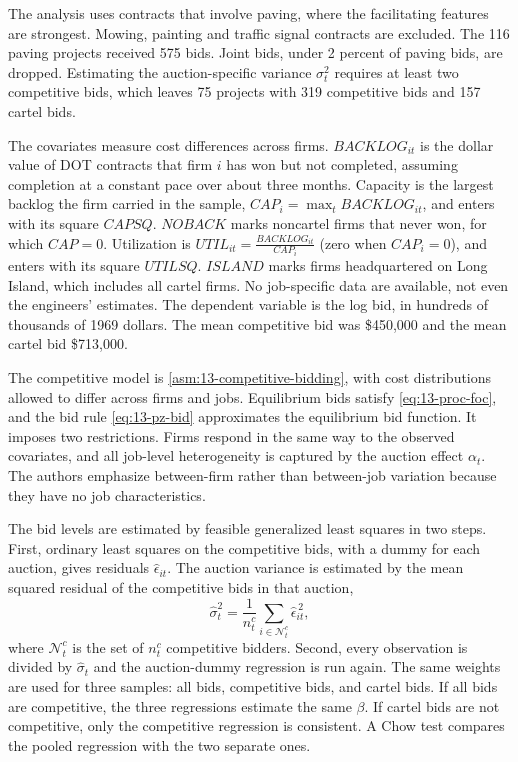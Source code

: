 The analysis uses contracts that involve paving, where the facilitating features are strongest. Mowing, painting
and traffic signal contracts are excluded. The 116 paving projects received 575 bids. Joint bids, under 2 percent of
paving bids, are dropped. Estimating the auction-specific variance $\sigma_t^2$ requires at least two competitive
bids, which leaves 75 projects with 319 competitive bids and 157 cartel bids.

The covariates measure cost differences across firms. $\mathit{BACKLOG}_{it}$ is the dollar value of DOT contracts
that firm $i$ has won but not completed, assuming completion at a constant pace over about three months. Capacity is
the largest backlog the firm carried in the sample, $\mathit{CAP}_i = \max_t \mathit{BACKLOG}_{it}$, and enters with
its square $\mathit{CAPSQ}$. $\mathit{NOBACK}$ marks noncartel firms that never won, for which $\mathit{CAP} = 0$.
Utilization is $\mathit{UTIL}_{it} = \frac{\mathit{BACKLOG}_{it}}{\mathit{CAP}_i}$ (zero when $\mathit{CAP}_i = 0$),
and enters with its square $\mathit{UTILSQ}$. $\mathit{ISLAND}$ marks firms headquartered on Long Island, which
includes all cartel firms. No job-specific data are available, not even the engineers' estimates. The dependent
variable is the log bid, in hundreds of thousands of 1969 dollars. The mean competitive bid was \$450,000 and the mean
cartel bid \$713,000.

The competitive model is \cref{asm:13-competitive-bidding}, with cost distributions allowed to differ across firms
and jobs. Equilibrium bids satisfy \eqref{eq:13-proc-foc}, and the bid rule \eqref{eq:13-pz-bid} approximates the
equilibrium bid function. It imposes two restrictions. Firms respond in the same way to the observed covariates, and
all job-level heterogeneity is captured by the auction effect $\alpha_t$. The authors emphasize between-firm rather
than between-job variation because they have no job characteristics.

The bid levels are estimated by feasible generalized least squares in two steps. First, ordinary least squares on
the competitive bids, with a dummy for each auction, gives residuals $\hat\epsilon_{it}$. The auction variance is
estimated by the mean squared residual of the competitive bids in that auction,
\begin{equation}\label{eq:13-pz-sigma}
  \hat\sigma_t^2 = \frac{1}{n^{c}_t}\sum_{i \in \mathcal{N}^{c}_t}\hat\epsilon_{it}^{\,2},
\end{equation}
where $\mathcal{N}^c_t$ is the set of $n^c_t$ competitive bidders. Second, every observation is divided by
$\hat\sigma_t$ and the auction-dummy regression is run again. The same weights are used for three samples: all
bids, competitive bids, and cartel bids. If all bids are competitive, the three regressions estimate the same
$\beta$. If cartel bids are not competitive, only the competitive regression is consistent. A Chow test compares
the pooled regression with the two separate ones.

